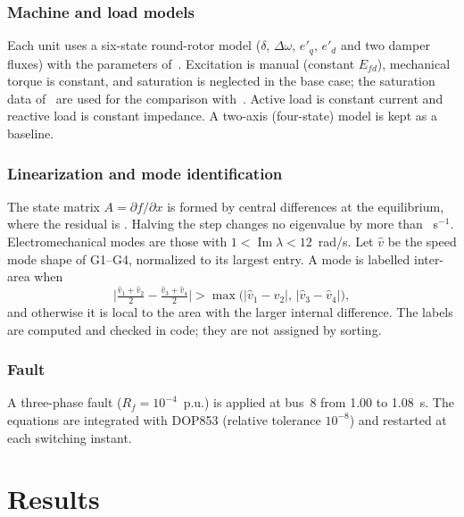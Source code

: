 \documentclass[conference,letterpaper]{IEEEtran}
\begin{document}
\subsubsection*{Machine and load models}
Each unit uses a six-state round-rotor model ($\delta$, $\Delta\omega$, $e'_q$, $e'_d$ and two damper fluxes) with the parameters of~\cite{kundur}. Excitation is manual (constant $E_{fd}$), mechanical torque is constant, and saturation is neglected in the base case; the saturation data of~\cite{kundur} are used for the comparison with~\cite{kundur}. Active load is constant current and reactive load is constant impedance. A two-axis (four-state) model is kept as a baseline.

\subsubsection*{Linearization and mode identification}
The state matrix $A=\partial f/\partial x$ is formed by central differences at the equilibrium, where the residual is \Veqres. Halving the step changes no eigenvalue by more than \Vjacdiff~s$^{-1}$. Electromechanical modes are those with $1<\operatorname{Im}\lambda<12$~rad/s. Let $\hat v$ be the speed mode shape of G1--G4, normalized to its largest entry. A mode is labelled inter-area when
\begin{equation}
\bigl|\tfrac{\hat v_1+\hat v_2}{2}-\tfrac{\hat v_3+\hat v_4}{2}\bigr|>\max\bigl(|\hat v_1-\hat v_2|,\,|\hat v_3-\hat v_4|\bigr),
\end{equation}
and otherwise it is local to the area with the larger internal difference. The labels are computed and checked in code; they are not assigned by sorting.

\subsubsection*{Fault}
A three-phase fault ($R_f=10^{-4}$~p.u.) is applied at bus~8 from 1.00 to 1.08~s. The equations are integrated with DOP853 (relative tolerance $10^{-8}$) and restarted at each switching instant.

\section{Results}
\end{document}
